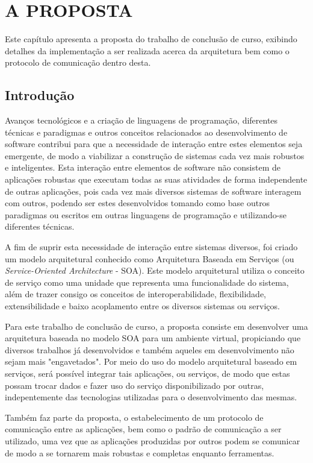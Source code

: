 \chapter[A PROPOSTA]{A PROPOSTA}

Este capítulo apresenta a proposta do trabalho de conclusão de curso, exibindo detalhes da implementação a ser realizada acerca da arquitetura bem como o protocolo de comunicação dentro desta.

\section{Introdução}
Avanços tecnológicos e a criação de linguagens de programação, diferentes técnicas e paradigmas e outros conceitos relacionados ao desenvolvimento de software contribui para que a necessidade de interação entre estes elementos seja emergente, de modo a viabilizar a construção de sistemas cada vez mais robustos e inteligentes. Esta interação entre elementos de software não consistem de aplicações robustas que executam todas as suas atividades de forma independente de outras aplicações, pois cada vez mais diversos sistemas de software interagem com outros, podendo ser estes desenvolvidos tomando como base outros paradigmas ou escritos em outras linguagens de programação e utilizando-se diferentes técnicas.

A fim de suprir esta necessidade de interação entre sistemas diversos, foi criado um modelo arquitetural conhecido como Arquitetura Baseada em Serviços (ou \textit{Service-Oriented Architecture} - SOA). Este modelo arquitetural utiliza o conceito de serviço como uma unidade que representa uma funcionalidade do sistema, além de trazer consigo os conceitos de interoperabilidade, flexibilidade, extensibilidade e baixo acoplamento entre os diversos sistemas ou serviços.

Para este trabalho de conclusão de curso, a proposta consiste em desenvolver uma arquitetura baseada no modelo SOA para um ambiente virtual, propiciando que diversos trabalhos já desenvolvidos e também aqueles em desenvolvimento não sejam mais "engavetados". Por meio do uso do modelo arquitetural baseado em serviços, será possível integrar tais aplicações, ou serviços, de modo que estas possam trocar dados e fazer uso do serviço disponibilizado por outras, indepentemente das tecnologias utilizadas para o desenvolvimento das mesmas.

Também faz parte da proposta, o estabelecimento de um protocolo de comunicação entre as aplicações, bem como o padrão de comunicação a ser utilizado, uma vez que as aplicações produzidas por outros podem se comunicar de modo a se tornarem mais robustas e completas enquanto ferramentas.

